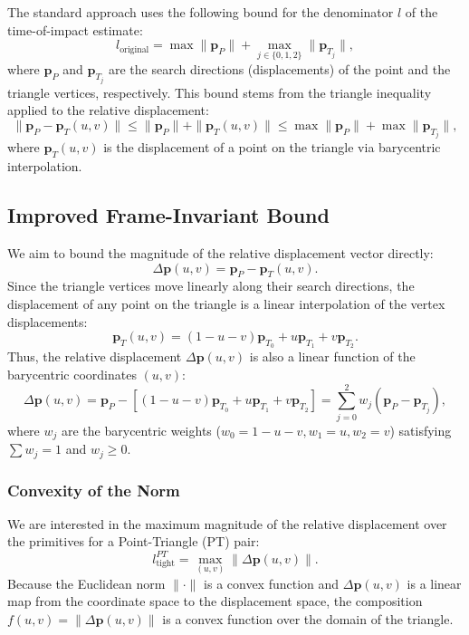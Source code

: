 \documentclass[acmtog,anonymous,review,screen,nonacm]{acmart}
\begin{document}
The standard approach uses the following bound for the denominator $l$ of the time-of-impact estimate:
\begin{equation}
    l_{\text{original}} = \max \|\mathbf{p}_P\| + \max_{j \in \{0,1,2\}} \|\mathbf{p}_{T_j}\|,
\end{equation}
where $\mathbf{p}_P$ and $\mathbf{p}_{T_j}$ are the search directions (displacements) of the point and the triangle vertices, respectively. This bound stems from the triangle inequality applied to the relative displacement:
\begin{equation}
    \|\mathbf{p}_P - \mathbf{p}_T(u, v)\| \le \|\mathbf{p}_P\| + \|\mathbf{p}_T(u, v)\| \le \max \|\mathbf{p}_P\| + \max \|\mathbf{p}_{T_j}\|,
\end{equation}
where $\mathbf{p}_T(u, v)$ is the displacement of a point on the triangle via barycentric interpolation.

\subsection{Improved Frame-Invariant Bound}
We aim to bound the magnitude of the relative displacement vector directly:
\begin{equation}
    \Delta \mathbf{p}(u, v) = \mathbf{p}_P - \mathbf{p}_T(u, v).
\end{equation}
Since the triangle vertices move linearly along their search directions, the displacement of any point on the triangle is a linear interpolation of the vertex displacements:
\begin{equation}
    \mathbf{p}_T(u, v) = (1-u-v)\mathbf{p}_{T_0} + u\mathbf{p}_{T_1} + v\mathbf{p}_{T_2}.
\end{equation}
Thus, the relative displacement $\Delta \mathbf{p}(u, v)$ is also a linear function of the barycentric coordinates $(u, v)$:
\begin{equation}
    \Delta \mathbf{p}(u, v) = \mathbf{p}_P - [(1-u-v)\mathbf{p}_{T_0} + u\mathbf{p}_{T_1} + v\mathbf{p}_{T_2}] = \sum_{j=0}^2 w_j (\mathbf{p}_P - \mathbf{p}_{T_j}),
\end{equation}
where $w_j$ are the barycentric weights ($w_0 = 1-u-v, w_1=u, w_2=v$) satisfying $\sum w_j = 1$ and $w_j \ge 0$.

\subsubsection{Convexity of the Norm}
We are interested in the maximum magnitude of the relative displacement over the primitives for a Point-Triangle (PT) pair:
\begin{equation}
    l_{\text{tight}}^{PT} = \max_{(u, v)} \| \Delta \mathbf{p}(u, v) \|.
\end{equation}
Because the Euclidean norm $\|\cdot\|$ is a convex function and $\Delta \mathbf{p}(u, v)$ is a linear map from the coordinate space to the displacement space, the composition $f(u, v) = \| \Delta \mathbf{p}(u, v) \|$ is a convex function over the domain of the triangle.
\end{document}
